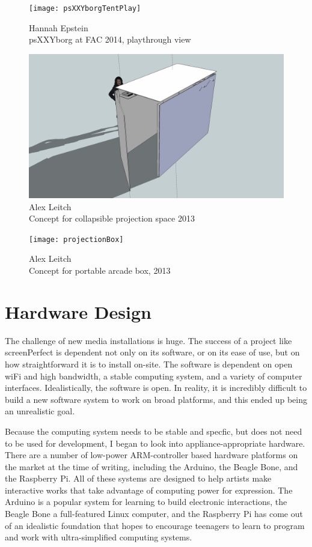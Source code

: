 \clearpage
\begin{figure}[!ht]
 \centering
  \texttt{[image: psXXYborgTentPlay]}
  \caption{Hannah Epstein\\psXXYborg at FAC 2014, playthrough view}
\end{figure}

\clearpage
\begin{figure}[!ht]
 \centering
  \includegraphics[width=\textwidth]{psXXYborgBox}
  \caption{Alex Leitch\\Concept for collapsible projection space 2013}
\end{figure}
\begin{figure}[!ht]
 \centering
  \texttt{[image: projectionBox]}
  \caption{Alex Leitch\\Concept for portable arcade box, 2013}
\end{figure}

\clearpage

\section{Hardware Design}
The challenge of new media installations is huge. The success of a project like screenPerfect is dependent not only on its software, or on its ease of use, but on how straightforward it is to install on-site. The software is dependent on open wiFi and high bandwidth, a stable computing system, and a variety of computer interfaces. Idealistically, the software is open. In reality, it is incredibly difficult to build a new software system to work on broad platforms, and this ended up being an unrealistic goal.

Because the computing system needs to be stable and specfic, but does not need to be used for development, I began to look into appliance-appropriate hardware. There are a number of low-power ARM-controller based hardware platforms on the market at the time of writing, including the Arduino, the Beagle Bone, and the Raspberry Pi. All of these systems are designed to help artists make interactive works that take advantage of computing power for expression. The Arduino is a popular system for learning to build electronic interactions, the Beagle Bone a full-featured Linux computer, and the Raspberry Pi has come out of an idealistic foundation that hopes to encourage teenagers to learn to program and work with ultra-simplified computing systems.

